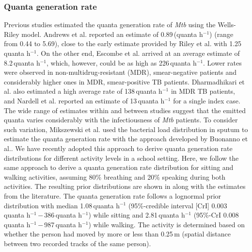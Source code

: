 \documentclass[fleqn,11pt]{wlscirep_supp}
\begin{document}
\subsubsection{Quanta generation rate}

Previous studies estimated the quanta generation rate of \emph{Mtb} using the Wells-Riley model\cite{Andrews2014JID,Riley1962ARRD,Escombe2008PLoSMed,Nardell1991ARRD,Dharmadhikari2012AJRCCM}. Andrews et al.\cite{Andrews2014JID} reported an estimate of 0.89\,(quanta h$^{-1}$) (range from 0.44 to 5.69), close to the early estimate provided by Riley et al.\cite{Riley1962ARRD} with 1.25\,quanta h$^{-1}$. On the other end, Escombe et al.\cite{Escombe2008PLoSMed} arrived at an average estimate of 8.2\,quanta h$^{-1}$, which, however, could be as high as 226\,quanta h$^{-1}$. Lower rates were observed in non-multidrug-resistant (MDR), smear-negative patients and considerably higher ones in MDR, smear-positive TB patients\cite{Escombe2008PLoSMed}. Dharmadhikari et al.\cite{Dharmadhikari2012AJRCCM} also estimated a high average rate of 138\,quanta h$^{-1}$ in MDR TB patients, and Nardell et al.\cite{Nardell1991ARRD} reported an estimate of 13\,quanta h$^{-1}$ for a single index case. The wide range of estimates within and between studies suggest that the emitted quanta varies considerably with the infectiousness of \emph{Mtb} patients\cite{Wurie2016BMJ}. To consider such variation, Mikszewski et al.\cite{Mikszewski2021GF} used the bacterial load distribution in sputum to estimate the quanta generation rate with the approach developed by Buonanno et al.\cite{Buonanno2020EI}. We have recently adopted this approach to derive quanta generation rate distributions for different activity levels in a school setting\cite{Banholzer2024PGPH}. Here, we follow the same approach to derive a quanta generation rate distribution for sitting and walking activities, assuming 80\% breathing and 20\% speaking during both activities. The resulting prior distributions are shown in  along with the estimates from the literature. The quanta generation rate follows a lognormal prior distribution with median 1.08\,quanta h$^{-1}$ (95\%-credible interval [CrI] 0.003\,quanta h$^{-1}$\,$-$\,386\,quanta h$^{-1}$) while sitting and 2.81\,quanta h$^{-1}$ (95\%-CrI 0.008\,quanta h$^{-1}$\,$-$\,987\,quanta h$^{-1}$) while walking. The activity is determined based on whether the person had moved by more or less than 0.25\,m (spatial distance between two recorded tracks of the same person). 
\end{document}
